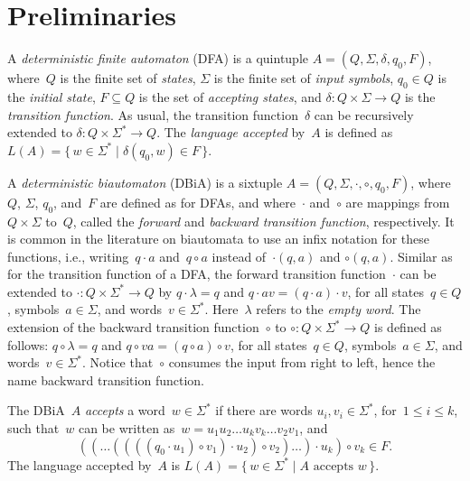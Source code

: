 \documentclass[submission]{eptcs}
\newcommand{\dfa}{\textrm{DFA}}
\newcommand{\dbia}{\textrm{DBiA}}
\begin{document}
\section{Preliminaries}
\label{sec:preliminaries}

A \emph{deterministic finite automaton} (\dfa) is a quintuple
$A=(Q,\Sigma,\delta,q_0,F)$, where~$Q$ is the finite set of
\emph{states}, $\Sigma$ is the finite set of \emph{input symbols},
$q_0\in Q$ is the \emph{initial state}, $F\subseteq Q$ is the set of
\emph{accepting states}, and $\delta\colon Q\times\Sigma\to Q$ is the
\emph{transition function}.  As usual, the transition
function~$\delta$ can be recursively extended to $\delta\colon
Q\times\Sigma^*\to Q$.  The \emph{language accepted} by~$A$ is defined
as $L(A) =\{\,w\in\Sigma^*\mid \delta(q_0,w)\in F\,\}$.

A \emph{deterministic biautomaton} (\dbia) is a sixtuple
$A=(Q,\Sigma,\cdot,\circ,q_0,F)$, where~$Q$, $\Sigma$, $q_0$, and~$F$
are defined as for \dfa s, and where~$\cdot$ and~$\circ$ are mappings
from~$Q\times\Sigma$ to~$Q$, called the \emph{forward} and
\emph{backward transition function}, respectively.  It is common in
the literature on biautomata to use an infix notation for these
functions, i.e., writing~$q\cdot a$ and~$q\circ a$ instead
of~$\cdot(q,a)$ and $\circ(q,a)$.  Similar as for the transition
function of a \dfa, the forward transition function~$\cdot$ can be
extended to $\cdot\colon Q\times\Sigma^* \to Q$ by 
$q\cdot \lambda = q$ and $q\cdot av = (q\cdot a)\cdot v$,
for all states~$q\in Q$, symbols~$a\in\Sigma$, and
words~$v\in\Sigma^*$. Here~$\lambda$ refers to the \emph{empty
  word}. The extension of the backward transition function~$\circ$ to
$\circ\colon Q\times\Sigma^* \to Q$ is defined as follows:
$q\circ \lambda = q$ and $q\circ va = (q\circ a)\circ v$, 
for all states~$q\in Q$, symbols~$a\in\Sigma$, and
words~$v\in\Sigma^*$.  Notice that~$\circ$ consumes the input from
right to left, hence the name backward transition function.

The \dbia~$A$ \emph{accepts} a word~$w\in\Sigma^*$ if there are
words $u_i,v_i\in\Sigma^*$, for~$1\leq i\leq k$, such that~$w$ can be
written as~$w=u_1u_2\dots u_k v_k \dots v_2 v_1$, and
\[((\dots((((q_0\cdot u_1)\circ v_1)\cdot u_2)\circ v_2)\dots)\cdot
u_k)\circ v_k \in F. \]
The language accepted by~$A$ is $L(A) = \{\, w\in\Sigma^* \mid
\text{$A$ accepts $w$}\,\}$.
\end{document}
